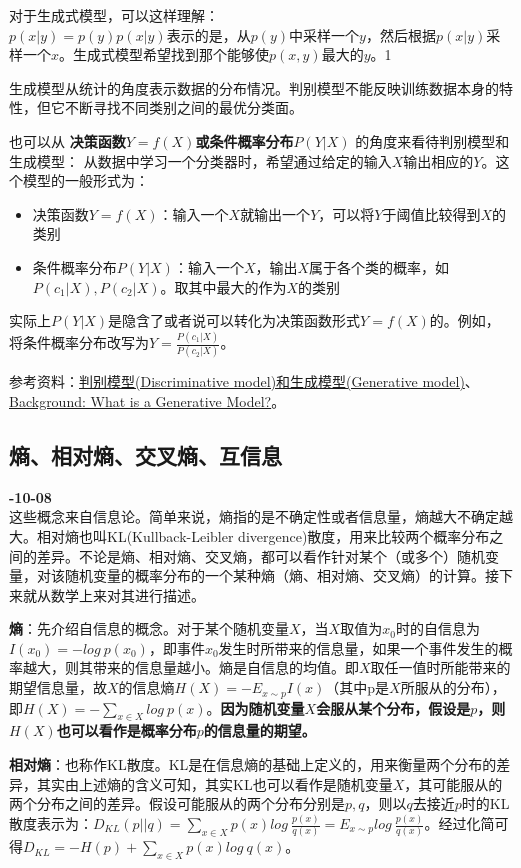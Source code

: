 对于生成式模型，可以这样理解：\\
$p(x | y) = p(y)p(x | y)$表示的是，从$p(y)$中采样一个$y$，然后根据$p(x|y)$采样一个$x$。生成式模型希望找到那个能够使$p(x, y)$最大的$y$。1


生成模型从统计的角度表示数据的分布情况。判别模型不能反映训练数据本身的特性，但它不断寻找不同类别之间的最优分类面。

也可以从 \textbf{决策函数$Y=f(X)$或条件概率分布$P(Y|X)$} 的角度来看待判别模型和生成模型：
从数据中学习一个分类器时，希望通过给定的输入$X$输出相应的$Y$。这个模型的一般形式为：
\begin{itemize}
	\item 决策函数$Y=f(X)$：输入一个$X$就输出一个$Y$，可以将$Y$于阈值比较得到$X$的类别
	\item 条件概率分布$P(Y|X)$：输入一个$X$，输出$X$属于各个类的概率，如$P(c_1 | X), P(c_2 | X)$。取其中最大的作为$X$的类别
\end{itemize}
实际上$P(Y|X)$是隐含了或者说可以转化为决策函数形式$Y=f(X)$的。例如，将条件概率分布改写为$Y = \frac{P(c_1 | X)}{P(c_2 | X) }$。

参考资料：\href{https://blog.csdn.net/fishmemory/article/details/51711114}{判别模型(Discriminative model)和生成模型(Generative model)}、\href{https://developers.google.cn/machine-learning/gan/generative?hl=zh-cn}{Background: What is a Generative Model?}。

\subsection{熵、相对熵、交叉熵、互信息} 
\textbf{-10-08}\\
这些概念来自信息论\cite{6773024}。简单来说，熵指的是不确定性或者信息量，熵越大不确定越大。相对熵也叫KL(Kullback-Leibler divergence)散度，用来比较两个概率分布之间的差异。不论是熵、相对熵、交叉熵，都可以看作针对某个（或多个）随机变量，对该随机变量的概率分布的一个某种熵（熵、相对熵、交叉熵）的计算。接下来就从数学上来对其进行描述。

\textbf{熵}：先介绍自信息的概念。对于某个随机变量$X$，当$X$取值为$x_0$时的自信息为$I(x_0) = -log\ p(x_0)$，即事件$x_0$发生时所带来的信息量，如果一个事件发生的概率越大，则其带来的信息量越小。熵是自信息的均值。即$X$取任一值时所能带来的期望信息量，故$X$的信息熵$H(X) = -E_{x\sim p}I(x)$（其中p是$X$所服从的分布），即$H(X) = -\sum_{x \in X}log\ p(x)$。\textbf{因为随机变量$X$会服从某个分布，假设是$p$，则$H(X)$也可以看作是概率分布$p$的信息量的期望。}

\textbf{相对熵}：也称作KL散度。KL是在信息熵的基础上定义的，用来衡量两个分布的差异，其实由上述熵的含义可知，其实KL也可以看作是随机变量$X$，其可能服从的两个分布之间的差异。假设可能服从的两个分布分别是$p, q$，则以$q$去接近$p$时的KL散度表示为：$D_{KL}(p||q) = \sum_{x \in X} p(x) log\ \frac{p(x)}{q(x)} = E_{x\sim p} log\ \frac{p(x)}{q(x)}$。经过化简可得$D_{KL} = -H(p) + \sum_{x \in X}p(x)log\ q(x)$。

